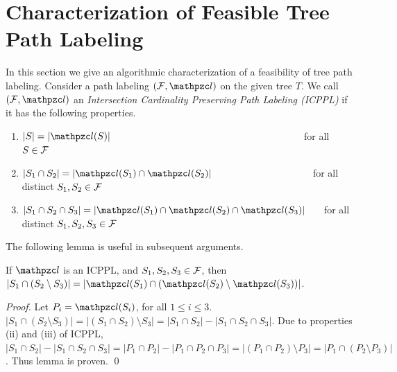 \documentclass[MS]             %
              {iitmdiss_as}    %
\begin{document}
\section{Characterization of Feasible Tree Path  Labeling} 
\label{sec:feasible} 

In this section we give an algorithmic characterization of a
feasibility of tree path labeling.
Consider a path labeling $(\cF, \cl)$ on the
given tree $T$. We call $(\cF, \cl)$ an {\em Intersection Cardinality
  Preserving Path Labeling (ICPPL)} if it has the following
properties.


\begin{enumerate}[{(\icpplpr\ }i) \ \ \ ]
\item \label{pr:i} $|S| = |\cl(S)|$ \ \ \ \ \ \ \ \ \ \ \ \ \ \ \ \ \ \ \ \ \ \ \ \
  \ \ \ \ \ \ \ \ \ \ \ \ \ \ \ for all $S \in {\cal F}$
\item \label{pr:ii}$|S_1 \cap S_2| = |\cl(S_1) \cap \cl(S_2)|$ \ \ \ \ \ \ \ \ \ \
  \ \ \ \ \ \ \ \ \ \ for all distinct
  $S_1, S_2 \in {\cal F}$
\item \label{pr:iii}$|S_1 \cap S_2 \cap S_3| = |\cl(S_1) \cap \cl(S_2) \cap
  \cl(S_3)|$ \ \ \ for all distinct $S_1, S_2, S_3 \in
  {\cal F}$
\end{enumerate}


\noindent
The following lemma is useful in subsequent arguments. 
\begin{lemma}
  \label{lem:setminuscard}
  If $\cl$ is an ICPPL, and $S_1, S_2, S_3 \in {\cal F}$, then $|S_1 \cap
  (S_2 \setminus S_3)| = |\cl(S_1) \cap (\cl(S_2) \setminus
  \cl(S_3))|$.
\end{lemma}
\begin{proof}%
  Let $P_i = \cl(S_i)$, for all $1 \le i \le  3$.
  $|S_1 \cap (S_2 \setminus S_3)| = |(S_1 \cap S_2) \setminus S_3| =
  |S_1 \cap S_2| - |S_1 \cap S_2 \cap S_3|$. Due to properties (ii)
  and (iii) of ICPPL, $|S_1 \cap S_2| - |S_1 \cap S_2 \cap S_3| = |P_1
  \cap P_2| - |P_1 \cap P_2 \cap P_3| = |(P_1 \cap P_2) \setminus P_3|
  = |P_1 \cap (P_2 \setminus P_3)|$. Thus lemma is proven. \qed
\end{proof}
\end{document}
